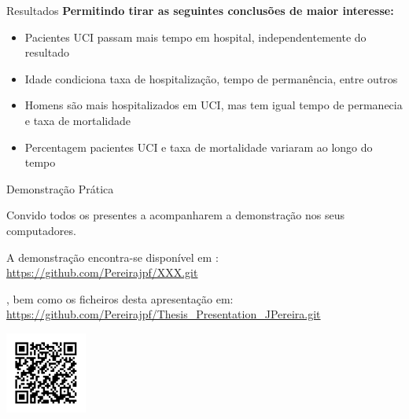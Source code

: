 \documentclass[pdf]
{beamer}
\begin{document}
\begin{frame}{Resultados}
		\textbf{Permitindo tirar as seguintes conclusões de maior interesse:}
		\vspace{0.5cm}
		\begin{itemize}
			\item Pacientes UCI passam mais tempo em hospital, independentemente do resultado
			\item Idade condiciona taxa de hospitalização, tempo de permanência, entre outros
			\item Homens são mais hospitalizados em UCI, mas tem igual tempo de permanecia e taxa de mortalidade
			\item Percentagem pacientes UCI e taxa de mortalidade variaram ao longo do tempo
		\end{itemize}
	
	
\end{frame}

\begin{frame}{Demonstração Prática}

\alert{\Large Convido todos os presentes a acompanharem a demonstração nos seus computadores.}
\vspace{0.4cm}
\centering

A demonstração encontra-se disponível em :
\vspace{0.2cm}
\scriptsize{
\url{https://github.com/Pereirajpf/XXX.git}
}

\vspace{0.4cm}

, bem como os ficheiros desta apresentação em:
\vspace{0.2cm}
\tiny{
\url{https://github.com/Pereirajpf/Thesis_Presentation_JPereira.git}
}

\includegraphics[width=0.2\textwidth]{Imagens/qrcode_apresentação.png}
\end{frame}

\end{document}
